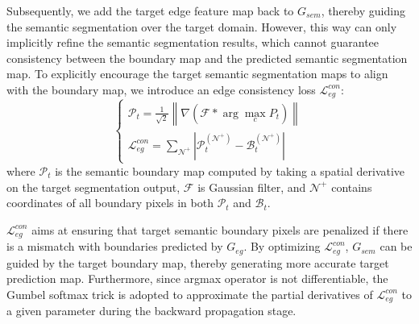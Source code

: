 \documentclass[sigconf]{acmart}
\begin{document}
\par Subsequently, we add the target edge feature map back to $G_{sem}$, thereby guiding the semantic segmentation over the target domain. However, this way can only implicitly refine the semantic segmentation results, which cannot guarantee consistency between the boundary map and the predicted semantic segmentation map. To explicitly encourage the target semantic segmentation maps to align with the boundary map, we introduce an edge consistency loss $\mathcal{L}_{e g}^{c o n}$:
\begin{equation}
    \left\{\begin{array}{l}
        \mathcal{P}_{t}=\frac{1}{\sqrt{2}}\left\|\nabla\left(\mathcal{F} * \arg \max\limits_{c} P_{t}\right)\right\| \\
        \mathcal{L}_{e g}^{c o n}=\sum\limits_{\mathcal{N}^{+}}\left|\mathcal{P}_{t}^{(\mathcal{N}^{+})}-\mathcal{B}_{t}^{(\mathcal{N}^{+})}\right|
        \end{array}\right.
\label{eq:4}
\end{equation}
where $\mathcal{P}_{t}$ is the semantic boundary map computed by taking a spatial derivative on the target segmentation output, $\mathcal{F}$ is Gaussian filter, and $\mathcal{N}^{+}$ contains coordinates of all boundary pixels in both $\mathcal{P}_{t}$ and $\mathcal{B}_{t}$. 

\par $\mathcal{L}_{e g}^{c o n}$ aims at ensuring that target semantic boundary pixels are penalized if there is a mismatch with boundaries predicted by $G_{eg}$. By optimizing $\mathcal{L}_{e g}^{c o n}$, $G_{sem}$ can be guided by the target boundary map, thereby generating more accurate target prediction map. Furthermore, since argmax operator is not differentiable, the Gumbel softmax trick \cite{jang2016categorical} is adopted to approximate the partial derivatives of $\mathcal{L}_{e g}^{c o n}$ to a given parameter during the backward propagation stage. 
\end{document}
